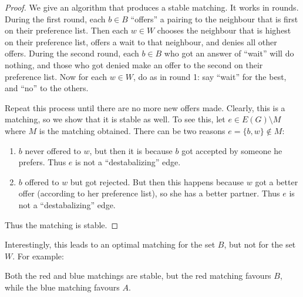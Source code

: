 \documentclass[12pt, a4paper]{book}
\theoremstyle{nonumberplain}
\newtheorem{proof}{Proof}
\begin{document}
\begin{proof}
    We give an algorithm that produces a stable matching.
    It works in rounds.
    During the first round, each $b\in B$ ``offers'' a pairing to the neighbour that is first on their preference list.
    Then each $w\in W$ chooses the neighbour that is highest on their preference list, offers a wait to that neighbour, and denies all other offers.
    During the second round, each $b\in B$ who got an answer of ``wait'' will do nothing, and those who got denied make an offer to the second on their preference list.
    Now for each $w\in W$, do as in round 1: say ``wait'' for the best, and ``no'' to the others.

    Repeat this process until there are no more new offers made.
    Clearly, this is a matching, so we show that it is stable as well.
    To see this, let $e\in E(G)\setminus M$ where $M$ is the matching obtained.
    There can be two reasons $e=\{b,w\}\notin M$:
    \begin{enumerate}[nolistsep]
        \item $b$ never offered to $w$, but then it is because $b$ got accepted by someone he prefers.
            Thus $e$ is not a ``destabalizing'' edge.
        \item $b$ offered to $w$ but got rejected.
            But then this happens because $w$ got a better offer (according to her preference list), so she has a better partner.
            Thus $e$ is not a ``destabalizing'' edge.
    \end{enumerate}
    Thus the matching is stable.
\end{proof}
Interestingly, this leads to an optimal matching for the set $B$, but not for the set $W$.
For example:
\begin{center}
\end{center}
Both the red and blue matchings are stable, but the red matching favours $B$, while the blue matching favours $A$.
\end{document}
